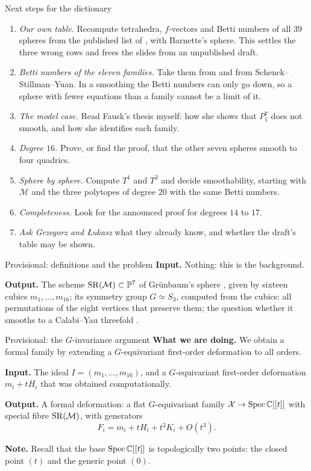 \begin{frame}{Next steps for the dictionary}
\begin{enumerate}
\setlength{\itemsep}{2pt}\small
\item \emph{Our own table.} Recompute tetrahedra, \(f\)-vectors and Betti numbers of all \(39\) spheres from the published list of \cite{GS}, with Barnette's sphere. This settles the three wrong rows and frees the slides from an unpublished draft.
\item \emph{Betti numbers of the eleven families.} Take them from \cite{CGKK} and from Schenck--Stillman--Yuan. In a smoothing the Betti numbers can only go down, so a sphere with fewer equations than a family cannot be a limit of it.
\item \emph{The model case.} Read Fausk's thesis myself: how she shows that \(P^7_1\) does not smooth, and how she identifies each family.
\item \emph{Degree \(16\).} Prove, or find the proof, that the other seven spheres smooth to four quadrics.
\item \emph{Sphere by sphere.} Compute \(T^1\) and \(T^2\) and decide smoothability, starting with \(\mathcal M\) and the three polytopes of degree \(20\) with the same Betti numbers.
\item \emph{Completeness.} Look for the announced proof for degrees \(14\) to \(17\).
\item \emph{Ask Grzegorz and Łukasz} what they already know, and whether the draft's table may be shown.
\end{enumerate}
\end{frame}

\begin{frame}{Provisional: definitions and the problem}
\textbf{Input.} Nothing: this is the background.
\par\bigskip
\textbf{Output.} The scheme \(\operatorname{SR}(\mathcal M)\subset\mathbb P^7\) of Grünbaum's sphere \cite{GS}, given by sixteen cubics \(m_1,\dots,m_{16}\); its symmetry group \(G\simeq S_3\), computed from the cubics: all permutations of the eight vertices that preserve them; the question whether it smooths to a Calabi--Yau threefold \cite{AC}.
\end{frame}

\begin{frame}{Provisional: the \(G\)-invariance argument}
\textbf{What we are doing.} We obtain a formal family by extending a \(G\)-equivariant first-order deformation to all orders.
\par\bigskip
\textbf{Input.} The ideal \(I=(m_1,\dots,m_{16})\), and a \(G\)-equivariant first-order deformation \(m_i+tH_i\) that was obtained computationally.
\par\bigskip
\textbf{Output.} A formal deformation: a flat \(G\)-equivariant family \(\mathcal X\to\operatorname{Spec}\mathbb C[[t]]\) with special fibre \(\operatorname{SR}(\mathcal M)\), with generators \[F_i=m_i+tH_i+t^2K_i+O(t^3).\]
\par\bigskip
\textbf{Note.} Recall that the base \(\operatorname{Spec}\mathbb C[[t]]\) is topologically two points: the closed point \((t)\) and the generic point \((0)\).
\end{frame}

